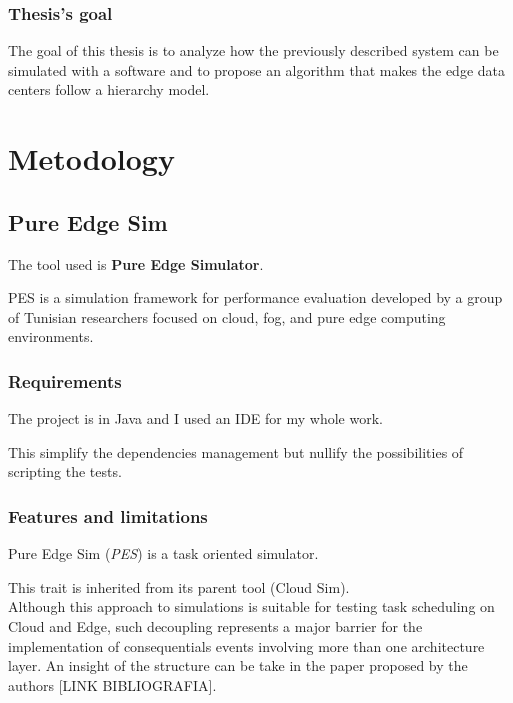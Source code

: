 \documentclass[12pt]{report}
\begin{document}
\section{Thesis's goal}
The goal of this thesis is to analyze how the previously described system can be simulated with a software and to propose an algorithm that makes the edge data centers follow a hierarchy model.

\part*{Metodology}
\chapter{Pure Edge Sim}
The tool used is \textbf{Pure Edge Simulator}.

PES is a simulation framework for performance evaluation developed by a group of Tunisian researchers focused on cloud, fog, and pure edge computing environments.

\section{Requirements}
The project is in Java and I used an IDE for my whole work.

This simplify the dependencies management but nullify the possibilities of scripting the tests.

\section{Features and limitations}
Pure Edge Sim (\textit{PES}) is a task oriented simulator.

This trait is inherited from its parent tool (Cloud Sim).\\
Although this approach to simulations is suitable for testing task scheduling on Cloud and Edge, such decoupling represents a major barrier for the implementation of consequentials events involving more than one architecture layer.
An insight of the structure can be take in the paper proposed by the authors [LINK BIBLIOGRAFIA].
\end{document}
